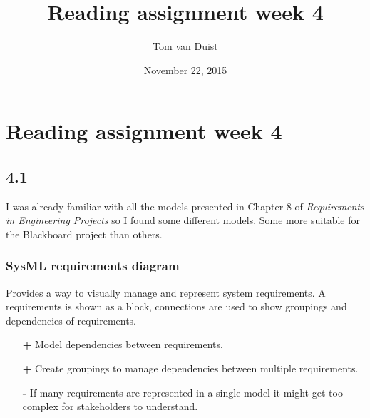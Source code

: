 

\title{Reading assignment week 4}
\newcommand{\TitelAbbr}{}
\newcommand{\Version}{0.1}



\what{}
\supervisors{}
\author{Tom van Duist}
\date{November 22, 2015}




\maketitle
\clearpage


\chapter*{Reading assignment week 4}

\section*{4.1}
I was already familiar with all the models presented in Chapter 8 of \emph{Requirements	in Engineering Projects}\cite{req_en_book} so I found some different models. Some more suitable for the Blackboard project than others.

\subsection*{SysML requirements diagram \cite{sysml}}
Provides a way to visually manage and represent system requirements. A requirements is shown as a block, connections are used to show groupings and dependencies of requirements.
\begin{itemize}
	\item[\textbf{+}] Model dependencies between requirements.
	\item[\textbf{+}] Create groupings to manage dependencies between multiple requirements.
	\item[\textbf{-}] If many requirements are represented in a single model it might get too complex for stakeholders to understand.
\end{itemize}

